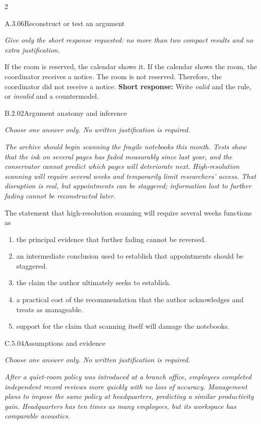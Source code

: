 \documentclass[9pt]{extarticle}
\newcommand{\choice}[1]{\item #1}
\begin{document}
\begin{multicols}{2}
\begin{DenseCoreProblem}{A.3.06}{Reconstruct or test an argument}
{\scriptsize\textit{Give only the short response requested: no more than two compact results and no extra justification.}\par}
If the room is reserved, the calendar shows it. If the calendar shows the room, the coordinator receives a notice. The room is not reserved. Therefore, the coordinator did not receive a notice.
\textbf{Short response:} Write \emph{valid} and the rule, or \emph{invalid} and a countermodel.
\end{DenseCoreProblem}
\begin{DenseCoreProblem}{B.2.02}{Argument anatomy and inference}
{\scriptsize\textit{Choose one answer only. No written justification is required.}\par}
\emph{The archive should begin scanning the fragile notebooks this month. Tests show that the ink on several pages has faded measurably since last year, and the conservator cannot predict which pages will deteriorate next. High-resolution scanning will require several weeks and temporarily limit researchers' access. That disruption is real, but appointments can be staggered; information lost to further fading cannot be reconstructed later.}

The statement that high-resolution scanning will require several weeks functions as
\begin{enumerate}[label=(\alph*)]
  \choice{the principal evidence that further fading cannot be reversed.}
  \choice{an intermediate conclusion used to establish that appointments should be staggered.}
  \choice{the claim the author ultimately seeks to establish.}
  \choice{a practical cost of the recommendation that the author acknowledges and treats as manageable.}
  \choice{support for the claim that scanning itself will damage the notebooks.}
\end{enumerate}
\end{DenseCoreProblem}
\columnbreak
\begin{DenseCoreProblem}{C.5.04}{Assumptions and evidence}
{\scriptsize\textit{Choose one answer only. No written justification is required.}\par}
\emph{After a quiet-room policy was introduced at a branch office, employees completed independent record reviews more quickly with no loss of accuracy. Management plans to impose the same policy at headquarters, predicting a similar productivity gain. Headquarters has ten times as many employees, but its workspace has comparable acoustics.}


\end{DenseCoreProblem}
\end{multicols}
\end{document}
